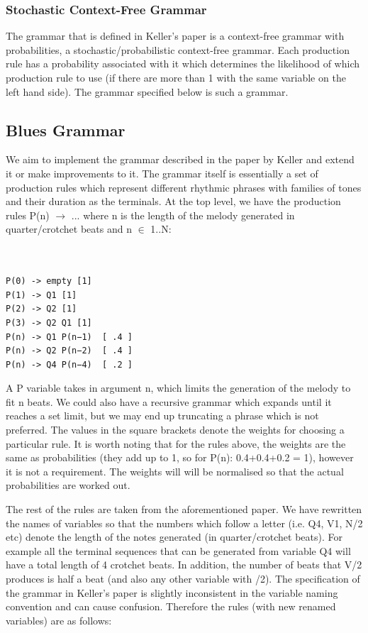 \documentclass[pdftex,12pt,a4paper]{report}
\begin{document}
\subsubsection{Stochastic Context-Free Grammar}
The grammar that is defined in Keller's paper \cite{keller07} is a context-free grammar with probabilities, a stochastic/probabilistic context-free grammar. Each production rule has a probability associated with it which determines the likelihood of which production rule to use (if there are more than 1 with the same variable on the left hand side). The grammar specified below is such a grammar.

\subsection{Blues Grammar}
We aim to implement the grammar described in the paper by Keller \cite{keller07} and extend it or make improvements to it. The grammar itself is essentially a set of production rules which represent different rhythmic phrases with families of tones and their duration as the terminals. At the top level, we have the production rules P(n) $\rightarrow$ ... where n is the length of the melody generated in quarter/crotchet beats and n $\in$ 1..N:

\begin{verbatim}


P(0) -> empty [1]
P(1) -> Q1 [1] 
P(2) -> Q2 [1] 
P(3) -> Q2 Q1 [1] 
P(n) -> Q1 P(n−1)  [ .4 ]
P(n) -> Q2 P(n−2)  [ .4 ] 
P(n) -> Q4 P(n−4)  [ .2 ]

\end{verbatim}

A P variable takes in argument n, which limits the generation of the melody to fit n beats. We could also have a recursive grammar which expands until it reaches a set limit, but we may end up truncating a phrase which is not preferred. The values in the square brackets denote the weights for choosing a particular rule. It is worth noting that for the rules above, the weights are the same as probabilities (they add up to 1, so for P(n):  0.4+0.4+0.2 = 1), however it is not a requirement. The weights will will be normalised so that the actual probabilities are worked out.

The rest of the rules are taken from the aforementioned paper. We have rewritten the names of variables so that the numbers which follow a letter (i.e. Q4, V1, N/2 etc) denote the length of the notes generated (in quarter/crotchet beats). For example all the terminal sequences that can be generated from variable Q4 will have a total length of 4 crotchet beats. In addition, the number of beats that V/2 produces is half a beat (and also any other variable with /2). The specification of the grammar in Keller's paper \cite{keller07} is slightly inconsistent in the variable naming convention and can cause confusion. Therefore the rules (with new renamed variables) are as follows:
\end{document}
